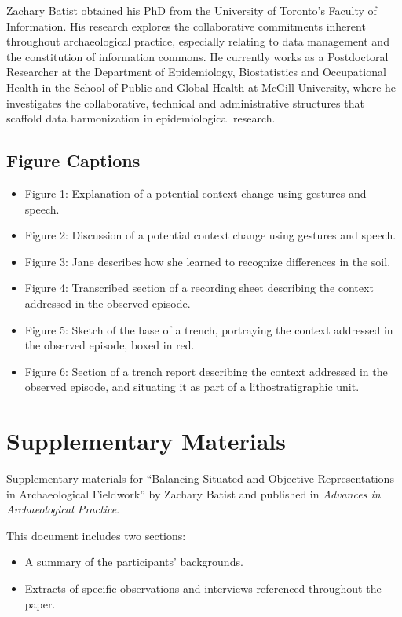 \documentclass[
]{article}
\providecommand{\tightlist}{%
  \setlength{\itemsep}{0pt}\setlength{\parskip}{0pt}}\usepackage{longtable,booktabs,array}
\begin{document}
Zachary Batist obtained his PhD from the University of Toronto's Faculty
of Information. His research explores the collaborative commitments
inherent throughout archaeological practice, especially relating to data
management and the constitution of information commons. He currently
works as a Postdoctoral Researcher at the Department of Epidemiology,
Biostatistics and Occupational Health in the School of Public and Global
Health at McGill University, where he investigates the collaborative,
technical and administrative structures that scaffold data harmonization
in epidemiological research.

\subsection{Figure Captions}\label{figure-captions}

\begin{itemize}
\tightlist
\item
  Figure 1: Explanation of a potential context change using gestures and
  speech.
\item
  Figure 2: Discussion of a potential context change using gestures and
  speech.
\item
  Figure 3: Jane describes how she learned to recognize differences in
  the soil.
\item
  Figure 4: Transcribed section of a recording sheet describing the
  context addressed in the observed episode.
\item
  Figure 5: Sketch of the base of a trench, portraying the context
  addressed in the observed episode, boxed in red.
\item
  Figure 6: Section of a trench report describing the context addressed
  in the observed episode, and situating it as part of a
  lithostratigraphic unit.
\end{itemize}

\section{Supplementary Materials}\label{supplementary-materials}

Supplementary materials for ``Balancing Situated and Objective
Representations in Archaeological Fieldwork'' by Zachary Batist and
published in \emph{Advances in Archaeological Practice}.

This document includes two sections:

\begin{itemize}
\tightlist
\item
  A summary of the participants' backgrounds.
\item
  Extracts of specific observations and interviews referenced throughout
  the paper.
\end{itemize}
\end{document}
